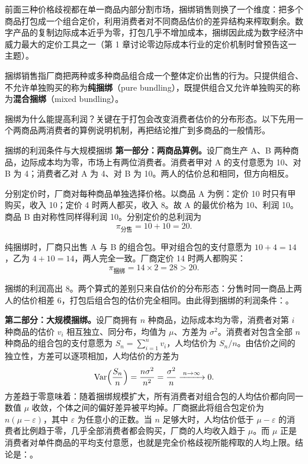 前面三种价格歧视都在单一商品内部分割市场，捆绑销售则换了一个维度：把多个商品打包成一个组合定价，利用消费者对不同商品估价的差异结构来榨取剩余。数字产品的复制边际成本近乎为零，打包几乎不增加成本，捆绑因此成为数字经济中威力最大的定价工具之一（第 1 章讨论零边际成本行业的定价机制时曾预告这一主题）。

\begin{definition}
捆绑销售指厂商把两种或多种商品组合成一个整体定价出售的行为。只提供组合、不允许单独购买的称为\textbf{纯捆绑}（pure bundling），既提供组合又允许单独购买的称为\textbf{混合捆绑}（mixed bundling）。
\end{definition}

捆绑为什么能提高利润？关键在于打包会改变消费者估价的分布形态。以下先用一个两商品两消费者的算例说明机制，再把结论推广到多商品的一般情形。

\begin{derivation}{捆绑的利润条件与大规模捆绑}{}
\textbf{第一部分：两商品算例。}设厂商生产 A、B 两种商品，边际成本均为零，市场上有两位消费者。消费者甲对 A 的支付意愿为 10、对 B 为 4；消费者乙对 A 为 4、对 B 为 10。两人的估价总和相同，但方向相反。

分别定价时，厂商对每种商品单独选择价格。以商品 A 为例：定价 10 时只有甲购买，收入 10；定价 4 时两人都买，收入 8。故 A 的最优价格为 10、利润 10。商品 B 由对称性同样得利润 10。分别定价的总利润为
\[
\pi_{\text{分售}} = 10 + 10 = 20.
\]

纯捆绑时，厂商只出售 A 与 B 的组合包。甲对组合包的支付意愿为 $10 + 4 = 14$，乙为 $4 + 10 = 14$，两人完全一致。厂商定价 14 时两人都购买：
\[
\pi_{\text{捆绑}} = 14 \times 2 = 28 > 20.
\]

捆绑的利润高出 8。两个算式的差别只来自估价的分布形态：分售时同一商品上两人的估价相差 6，打包后组合包的估价完全相同。由此得到捆绑的利润条件：。

\textbf{第二部分：大规模捆绑。}设厂商拥有 $n$ 种商品，边际成本均为零，消费者对第 $i$ 种商品的估价 $v_i$ 相互独立、同分布，均值为 $\mu$、方差为 $\sigma^2$。消费者对包含全部 $n$ 种商品的组合包的支付意愿为 $S_n = \sum_{i=1}^{n} v_i$，人均估价为 $S_n/n$。由估价之间的独立性，方差可以逐项相加，人均估价的方差为
\[
\operatorname{Var}\Bigl(\frac{S_n}{n}\Bigr) = \frac{n\sigma^2}{n^2} = \frac{\sigma^2}{n} \xrightarrow{\;n \to \infty\;} 0.
\]
方差趋于零意味着：随着捆绑规模扩大，所有消费者对组合包的人均估价都向同一数值 $\mu$ 收敛，个体之间的偏好差异被平均掉。厂商据此将组合包定价为 $n(\mu - \varepsilon)$，其中 $\varepsilon$ 为任意小的正数。当 $n$ 足够大时，人均估价低于 $\mu - \varepsilon$ 的消费者比例趋于零，几乎全部消费者都会购买，厂商的人均收入趋于 $\mu$。而 $\mu$ 正是消费者对单件商品的平均支付意愿，也就是完全价格歧视所能榨取的人均上限。结论是：。
\end{derivation}

